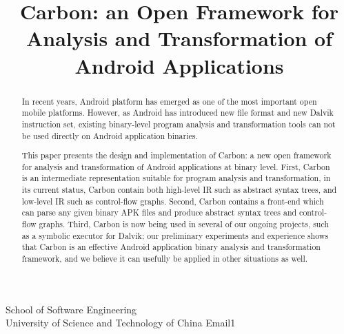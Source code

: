 \documentclass[10pt, preprint, cm]{sigplanconf}
\begin{document}
\setlength{\pdfpageheight}{\paperheight}
\setlength{\pdfpagewidth}{\paperwidth}






\title{Carbon: an Open Framework for Analysis and Transformation of Android Applications}

           {School of Software Engineering\\
           University of Science and Technology of China}
           {Email1}

\maketitle

\begin{abstract}
In recent years, Android platform has emerged as one of the most
important open mobile platforms. However, as Android has introduced
new file format and new Dalvik instruction set, existing binary-level
program analysis and transformation tools can not be used directly on
Android application binaries.

This paper presents the design and implementation of Carbon: a
new open framework for analysis and transformation of Android
applications at binary level. First, Carbon is an intermediate
representation suitable for program analysis and transformation, in
its current status, Carbon contain both high-level IR such as
abstract syntax trees, and low-level IR such as control-flow graphs. Second, Carbon
contains a front-end which can parse any given binary APK files and produce
abstract syntax trees and control-flow graphs. Third, Carbon is
now being used in several of
our ongoing projects, such as a symbolic executor for Dalvik; our
preliminary experiments and experience shows that Carbon is
an effective Android application binary analysis and transformation
framework, and we believe it can usefully be applied in other
situations as well.
\end{abstract}
\end{document}
